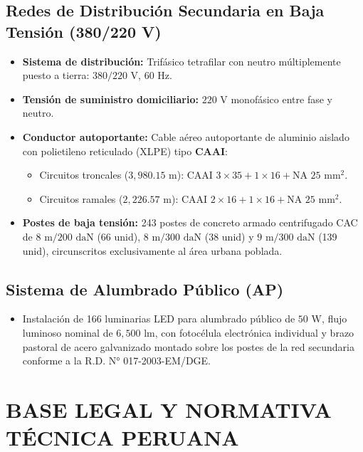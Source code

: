 \subsection{Redes de Distribución Secundaria en Baja Tensión (380/220 V)}
\begin{itemize}
  \item \textbf{Sistema de distribución:} Trifásico tetrafilar con neutro múltiplemente puesto a tierra: $380/220\text{ V}$, $60\text{ Hz}$.
  \item \textbf{Tensión de suministro domiciliario:} $220\text{ V}$ monofásico entre fase y neutro.
  \item \textbf{Conductor autoportante:} Cable aéreo autoportante de aluminio aislado con polietileno reticulado (XLPE) tipo \textbf{CAAI}:
    \begin{itemize}
      \item Circuitos troncales ($3,980.15\text{ m}$): $\text{CAAI } 3\times 35 + 1\times 16 + \text{NA } 25\text{ mm}^2$.
      \item Circuitos ramales ($2,226.57\text{ m}$): $\text{CAAI } 2\times 16 + 1\times 16 + \text{NA } 25\text{ mm}^2$.
    \end{itemize}
  \item \textbf{Postes de baja tensión:} 243 postes de concreto armado centrifugado CAC de $8\text{ m}/200\text{ daN}$ (66 unid), $8\text{ m}/300\text{ daN}$ (38 unid) y $9\text{ m}/300\text{ daN}$ (139 unid), circunscritos exclusivamente al área urbana poblada.
\end{itemize}

\subsection{Sistema de Alumbrado Público (AP)}
\begin{itemize}
  \item Instalación de 166 luminarias LED para alumbrado público de $50\text{ W}$, flujo luminoso nominal de $6,500\text{ lm}$, con fotocélula electrónica individual y brazo pastoral de acero galvanizado montado sobre los postes de la red secundaria conforme a la R.D. N° 017-2003-EM/DGE.
\end{itemize}

\section{BASE LEGAL Y NORMATIVA TÉCNICA PERUANA}

